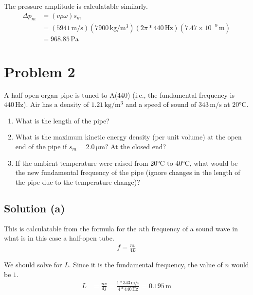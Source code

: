 \documentclass[12pt]{article}
\newcommand{\E}[1]{\times 10^{#1}}
\begin{document}
            The pressure amplitude is calculatable similarly.
            \begin{align}
                \Delta p_m  &=  (v \rho \omega) s_m\\
                    &=  (5941\,\unit{\meter/\second}) (7900\,\unit{\kilo\gram/\meter^3}) (2\pi * 440\,\unit{\hertz}) (7.47\E{-9}\,\unit{\meter})\\
                    &=  \boxed{968.85\,\unit{\pascal}}
            \end{align}
        
    \pagebreak
    \section{Problem 2}
        A half-open organ pipe is tuned to A(440) (i.e., the fundamental frequency is $440\,\unit{\hertz}$).
        Air has a density of $1.21\,\unit{\kilo\gram/\meter^3}$ and a speed of sound of $343\,\unit{\meter/\second}$ at $20\unit{\celsius}$.
        
        \begin{enumerate}[label=\alph*.]
            \item   What is the length of the pipe?
            \item   What is the maximum kinetic energy density (per unit volume) at the open end of the pipe if $s_m = 2.0\,\unit{\micro\meter}$?  At the closed end?
            \item   If the ambient temperature were raised from 20\unit{\celsius} to 40\unit{\celsius}, what would be the new fundamental frequency of the pipe (ignore changes in the length of the pipe due to the temperature change)?
        \end{enumerate}
    
        \subsection{Solution (a)}
            This is calculatable from the formula for the $n$th frequency of a sound wave in what is in this case a half-open tube.
            \begin{gather}
                f   =   \frac{nv}{4L}
            \end{gather}

            We should solve for $L$. Since it is the fundamental frequency, the value of $n$ would be $1$.
            \begin{align}
                L   &=  \frac{nv}{4f}
                    =   \frac{1 * 343\,\unit{\meter/\second}}{4 * 440\,\unit{\hertz}}
                    =   \boxed{0.195\,\unit{\meter}}
            \end{align}
\end{document}
